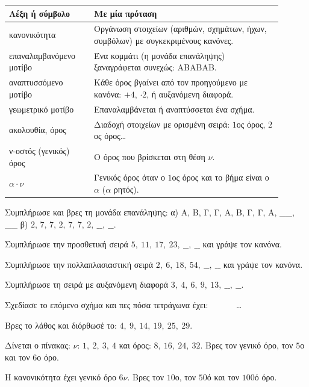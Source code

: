 

\renewcommand{\arraystretch}{1.5}
\begin{longtable}{@{}>{\raggedright\arraybackslash}p{0.28\linewidth} >{\raggedright\arraybackslash}p{0.62\linewidth}@{}}
\toprule
\textbf{Λέξη ή σύμβολο} & \textbf{Με μία πρόταση}\\
\midrule
\endhead
κανονικότητα & Οργάνωση στοιχείων (αριθμών, σχημάτων, ήχων, συμβόλων) με συγκεκριμένους κανόνες.\\
επαναλαμβανόμενο μοτίβο & Ένα κομμάτι (η μονάδα επανάληψης) ξαναγράφεται συνεχώς: ΑΒΑΒΑΒ.\\
αναπτυσσόμενο μοτίβο & Κάθε όρος βγαίνει από τον προηγούμενο με κανόνα: $+4$, $\cdot2$, ή αυξανόμενη διαφορά.\\
γεωμετρικό μοτίβο & Επαναλαμβάνεται ή αναπτύσσεται ένα σχήμα.\\
ακολουθία, όρος & Διαδοχή στοιχείων με ορισμένη σειρά: $1$ος όρος, $2$ος όρος\ldots\\
ν-οστός (γενικός) όρος & Ο όρος που βρίσκεται στη θέση $\nu$.\\
$\alpha\cdot\nu$ & Γενικός όρος όταν ο $1$ος όρος και το βήμα είναι ο $\alpha$ ($\alpha$ ρητός).\\
\bottomrule
\end{longtable}


\ex Συμπλήρωσε και βρες τη μονάδα επανάληψης: α) Α, Β, Γ, Γ, Α, Β, Γ, Γ, Α, \_\_, \_\_ \quad β) $2,\,7,\,7,\,2,\,7,\,7,\,2,\ \_\_,\ \_\_$.

\ex Συμπλήρωσε την προσθετική σειρά $5,\ 11,\ 17,\ 23,\ \_\_,\ \_\_$ και γράψε τον κανόνα.

\ex Συμπλήρωσε την πολλαπλασιαστική σειρά $2,\ 6,\ 18,\ 54,\ \_\_,\ \_\_$ και γράψε τον κανόνα.

\ex Συμπλήρωσε τη σειρά με αυξανόμενη διαφορά $3,\ 4,\ 6,\ 9,\ 13,\ \_\_,\ \_\_$.

\ex Σχεδίασε το επόμενο σχήμα και πες πόσα τετράγωνα έχει: \ \ \ \ \ \ \ldots

\ex Βρες το λάθος και διόρθωσέ το: $4,\ 9,\ 14,\ 19,\ 25,\ 29$.

\ex Δίνεται ο πίνακας: $\nu$: $1,\ 2,\ 3,\ 4$ και όρος: $8,\ 16,\ 24,\ 32$. Βρες τον γενικό όρο, τον $5$ο και τον $6$ο όρο.

\ex Η κανονικότητα έχει γενικό όρο $6\nu$. Βρες τον $10$ο, τον $50$ό και τον $100$ό όρο.

